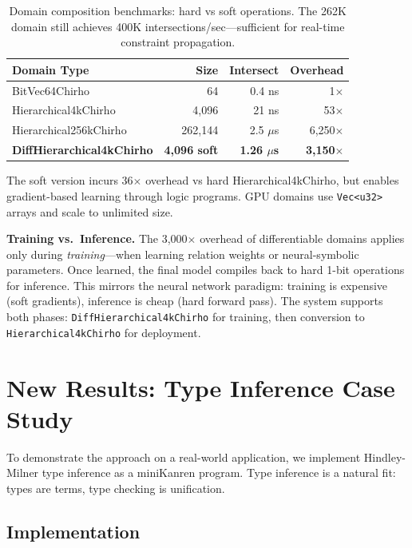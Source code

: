 \documentclass[11pt,a4paper]{article}
\begin{document}
\begin{table}[H]
\centering
\begin{tabular}{lrrr}
\toprule
\textbf{Domain Type} & \textbf{Size} & \textbf{Intersect} & \textbf{Overhead} \\
\midrule
BitVec64Chirho & 64 & 0.4 ns & 1$\times$ \\
Hierarchical4kChirho & 4,096 & 21 ns & 53$\times$ \\
Hierarchical256kChirho & 262,144 & 2.5 $\mu$s & 6,250$\times$ \\
\textbf{DiffHierarchical4kChirho} & \textbf{4,096 soft} & \textbf{1.26 $\mu$s} & \textbf{3,150$\times$} \\
\bottomrule
\end{tabular}
\caption{Domain composition benchmarks: hard vs soft operations. The 262K domain still achieves 400K intersections/sec---sufficient for real-time constraint propagation.}
\label{tab:domain_composition}
\end{table}

The soft version incurs 36$\times$ overhead vs hard Hierarchical4kChirho, but enables gradient-based learning through logic programs. GPU domains use \texttt{Vec<u32>} arrays and scale to unlimited size.

\textbf{Training vs.\ Inference.}
The 3,000$\times$ overhead of differentiable domains applies only during \emph{training}---when learning relation weights or neural-symbolic parameters.
Once learned, the final model compiles back to hard 1-bit operations for inference.
This mirrors the neural network paradigm: training is expensive (soft gradients), inference is cheap (hard forward pass).
The system supports both phases: \texttt{DiffHierarchical4kChirho} for training, then conversion to \texttt{Hierarchical4kChirho} for deployment.

\section{New Results: Type Inference Case Study}

To demonstrate the approach on a real-world application, we implement Hindley-Milner type inference as a miniKanren program.
Type inference is a natural fit: types are terms, type checking is unification.

\subsection{Implementation}
\end{document}
